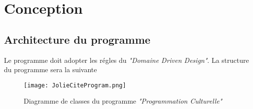 \chapter{Conception}

\section{Architecture du programme}

Le programme doit adopter les régles du \textit{"Domaine Driven Design"}. La structure du programme sera la suivante 

\begin{figure}[h]
    \texttt{[image: JolieCiteProgram.png]}
    \caption{Diagramme de classes du programme \textit{"Programmation Culturelle"}}
\end{figure}



\section{}
